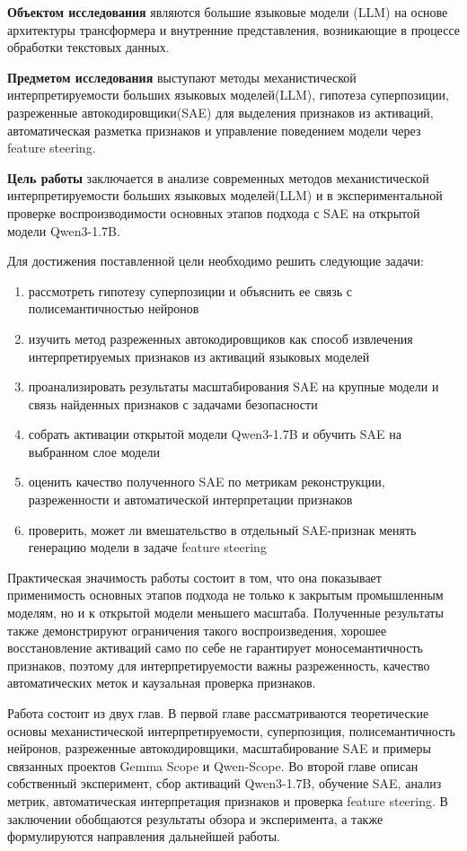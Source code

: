 \documentclass[a4paper,14pt]{extreport}
\begin{document}
\textbf{Объектом исследования} являются большие языковые модели (LLM) на основе
архитектуры трансформера и внутренние представления, возникающие в процессе
обработки текстовых данных.

\textbf{Предметом исследования} выступают методы механистической
интерпретируемости больших языковых моделей(LLM), гипотеза суперпозиции,
разреженные автокодировщики(SAE) для выделения признаков из активаций, автоматическая
разметка признаков и управление поведением модели через feature steering.

\textbf{Цель работы} заключается в анализе современных методов механистической
интерпретируемости больших языковых моделей(LLM) и в экспериментальной проверке
воспроизводимости основных этапов подхода с SAE на открытой модели Qwen3-1.7B.

Для достижения поставленной цели необходимо решить следующие задачи:
\begin{enumerate}
    \item рассмотреть гипотезу суперпозиции и объяснить ее связь с
          полисемантичностью нейронов
    \item изучить метод разреженных автокодировщиков как способ извлечения
          интерпретируемых признаков из активаций языковых моделей
    \item проанализировать результаты масштабирования SAE на крупные модели и
          связь найденных признаков с задачами безопасности
    \item собрать активации открытой модели Qwen3-1.7B и обучить SAE на выбранном
          слое модели
    \item оценить качество полученного SAE по метрикам реконструкции,
          разреженности и автоматической интерпретации признаков
    \item проверить, может ли вмешательство в отдельный SAE-признак менять
          генерацию модели в задаче feature steering
\end{enumerate}

Практическая значимость работы состоит в том, что она показывает применимость
основных этапов подхода не только к закрытым промышленным моделям, но и к
открытой модели меньшего масштаба. Полученные результаты также демонстрируют
ограничения такого воспроизведения, хорошее восстановление активаций само по себе
не гарантирует моносемантичность признаков, поэтому для интерпретируемости важны
разреженность, качество автоматических меток и каузальная проверка признаков.

Работа состоит из двух глав. В первой главе рассматриваются теоретические основы
механистической интерпретируемости, суперпозиция, полисемантичность нейронов,
разреженные автокодировщики, масштабирование SAE и примеры связанных проектов
Gemma Scope и Qwen-Scope. Во второй главе описан собственный эксперимент,
сбор активаций Qwen3-1.7B, обучение SAE, анализ метрик, автоматическая
интерпретация признаков и проверка feature steering. В заключении обобщаются
результаты обзора и эксперимента, а также формулируются направления дальнейшей
работы.
\end{document}
